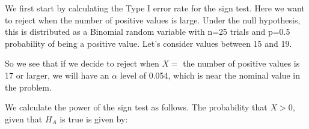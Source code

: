 We first start by calculating the Type I error rate for the sign test.  Here we want to
reject when the number of positive values is large.  Under the null hypothesis, this is
distributed as a Binomial random variable with n=25 trials and p=0.5 probability of being
a positive value.  Let's consider values between 15 and 19.
\begin{knitrout}
\end{knitrout}

So we see that if we decide to reject when $X =$ the number of positive values is
17 or larger, we will have an $\alpha$ level of 0.054,
which is near the nominal value in the problem.

We calculate the power of the sign test as follows. The probability that $X > 0$, given that $H_A$ is true is given by:
\begin{knitrout}
\end{knitrout}

